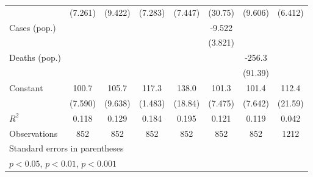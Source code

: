 \documentclass{article}
\begin{document}
{\begin{longtable}{l*{7}{c}}
                &  (7.261)         &  (9.422)         &  (7.283)         &  (7.447)         &  (30.75)         &  (9.606)         &  (6.412)         \\
Cases (pop.)    &                  &                  &                  &                  &   -9.522         &                  &                  \\
                &                  &                  &                  &                  &  (3.821)         &                  &                  \\
Deaths (pop.)   &                  &                  &                  &                  &                  &   -256.3\sym{*}  &                  \\
                &                  &                  &                  &                  &                  &  (91.39)         &                  \\
Constant        &    100.7\sym{***}&    105.7\sym{***}&    117.3\sym{***}&    138.0\sym{***}&    101.3\sym{***}&    101.4\sym{***}&    112.4\sym{**} \\
                &  (7.590)         &  (9.638)         &  (1.483)         &  (18.84)         &  (7.475)         &  (7.642)         &  (21.59)         \\
\hline
\(R^{2}\)       &    0.118         &    0.129         &    0.184         &    0.195         &    0.121         &    0.119         &    0.042         \\
Observations    &      852         &      852         &      852         &      852         &      852         &      852         &     1212         \\
\hline\hline
\multicolumn{8}{l}{\footnotesize Standard errors in parentheses}\\
\multicolumn{8}{l}{\footnotesize \sym{*} \(p<0.05\), \sym{**} \(p<0.01\), \sym{***} \(p<0.001\)}\\
\end{longtable}
}
\end{document}
